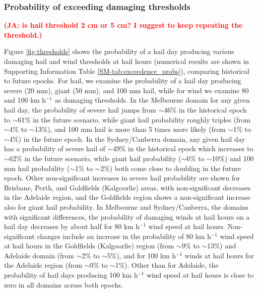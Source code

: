 \documentclass[]{agujournal2019}\usepackage[]{graphicx}\usepackage[]{xcolor}
\newcommand*{\todo}[1]{\textbf{\textcolor{red}{(#1)}}}
\begin{document}
\subsubsection{Probability of exceeding damaging thresholds}

\todo{JA: is hail threshold 2 cm or 5 cm? I suggest to keep repeating the threshold.}



Figure \ref{fig:thresholds} shows the probability of a hail day producing
various damaging hail and wind thresholds at hail hours (numerical results are
shown in Supporting Information Table \ref{SM-tab:exceedence_probs}), comparing
historical to future epochs. For hail, we examine the probability of a hail day
producing severe (20 mm), giant (50 mm), and 100 mm hail, while for wind we
examine 80 and 100 km h$^{-1}$ as damaging thresholds. In the Melbourne domain
for any given hail day, the probability of severe hail jumps from
$\sim$46\% in the historical epoch to
$\sim$61\% in the future scenario, while
giant hail probability roughly triples (from $\sim$4\% to $\sim$13\%), and 100 mm
hail is more than 5 times more likely (from $\sim$1\% to $\sim$4\%) in the
future epoch. In the Sydney/Canberra domain, any given hail day has a
probability of severe hail of $\sim$49\% in the historical epoch which increases to
$\sim$62\% in the future scenario,
while giant hail probability ($\sim$6\% to $\sim$10\%) and
100 mm hail probability ($\sim$1\% to $\sim$2\%) both
come close to doubling in the future epoch. Other non-significant increases in
severe hail probability are shown for Brisbane, Perth, and Goldfields
(Kalgoorlie) areas, with non-significant decreases in the Adelaide region, and
the Goldfields region shows a non-significant increase also for giant hail
probability. In Melbourne and Sydney/Canberra, the domains with significant
differences, the probability of damaging winds at hail hours on a hail day
decreases by about half for 80 km h$^{-1}$ wind speed at hail hours.
Non-significant changes include an increase in the probability of 80 km h$^{-1}$
wind speed at hail hours in the Goldfields (Kalgoorlie) region (from
$\sim$9\% to
$\sim$13\%) and Adelaide domain (from
$\sim$2\% to
$\sim$5\%), and for 100 km h$^{-1}$
winds at hail hours for the Adelaide region (from $\sim$0\% to $\sim$1\%).
Other than for Adelaide, the probability of hail days producing 100 km h$^{-1}$
wind speed at hail hours is close to zero in all domains across both epochs. 
\end{document}
